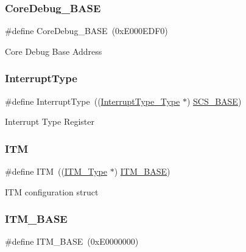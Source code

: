 \subsubsection{\texorpdfstring{CoreDebug\_BASE}{CoreDebug\_BASE}}
{\footnotesize\ttfamily \#define Core\+Debug\+\_\+\+B\+A\+SE~(0x\+E000\+E\+D\+F0)}

Core Debug Base Address ~\newline
 \mbox{\label{group___c_m_s_i_s___c_m3__core__register_ga164238adbad56f07c7dd4e912af748dd}} 
\subsubsection{\texorpdfstring{InterruptType}{InterruptType}}
{\footnotesize\ttfamily \#define Interrupt\+Type~((\mbox{\hyperlink{struct_interrupt_type___type}{Interrupt\+Type\+\_\+\+Type}} $\ast$) \mbox{\hyperlink{group___c_m_s_i_s___c_m3__core__register_ga3c14ed93192c8d9143322bbf77ebf770}{S\+C\+S\+\_\+\+B\+A\+SE}})}

Interrupt Type Register ~\newline
 \mbox{\label{group___c_m_s_i_s___c_m3__core__register_gabae7cdf882def602cb787bb039ff6a43}} 
\subsubsection{\texorpdfstring{ITM}{ITM}}
{\footnotesize\ttfamily \#define I\+TM~((\mbox{\hyperlink{struct_i_t_m___type}{I\+T\+M\+\_\+\+Type}} $\ast$)           \mbox{\hyperlink{group___c_m_s_i_s___c_m3__core__register_gadd76251e412a195ec0a8f47227a8359e}{I\+T\+M\+\_\+\+B\+A\+SE}})}

I\+TM configuration struct ~\newline
 \mbox{\label{group___c_m_s_i_s___c_m3__core__register_gadd76251e412a195ec0a8f47227a8359e}} 
\subsubsection{\texorpdfstring{ITM\_BASE}{ITM\_BASE}}
{\footnotesize\ttfamily \#define I\+T\+M\+\_\+\+B\+A\+SE~(0x\+E0000000)}

